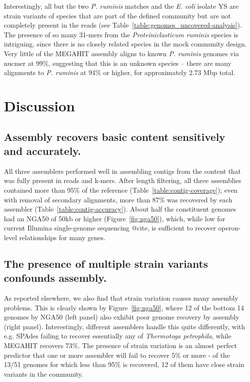 \documentclass[11pt]{article}
\begin{document}
Interestingly, all but the two {\em P. ruminis} matches and the {\em
  E. coli} isolate YS are strain variants of species that are part of
the defined community but are not completely present in the reads (see
Table~\ref{table:genomes_uncovered-analysis}).  The presence of so
many 31-mers from the {\em Proteiniclasticum ruminis} species is
intriguing, since there is no closely related species in the mock
community design.  Very little of the MEGAHIT assembly aligns to known
{\em P. ruminis} genomes via nucmer at 99\%, suggesting that this is an
unknown species -- there are many alignments to {\em P. ruminis} at
94\% or higher, for approximately 2.73 Mbp total.

\section*{Discussion}

\subsection*{Assembly recovers basic content sensitively and accurately.}

All three assemblers performed well in assembling contigs from the
content that was fully present in reads and k-mers.  After length filtering,
all three assemblies contained more than 95\% of the reference
(Table~\ref{table:contig-coverage}); even with removal of secondary
alignments, more than 87\% was recovered by each assembler
(Table~\ref{table:contig-accuracy}). About half the constituent genomes had
an NGA50 of 50kb or higher (Figure~\ref{fig:nga50}),
which, while low for current Illumina single-genome sequencing @cite,
is sufficient to recover operon-level relationships for many genes.



\subsection*{The presence of multiple strain variants confounds assembly.}

As reported elsewhere, we also find that strain variation causes many
assembly problems.  This is clearly shown by Figure~\ref{fig:nga50},
where 12 of the bottom 14 genomes by NGA50 (left panel) also exhibit
poor genome recovery by assembly (right panel).  Interestingly,
different assemblers handle this quite differently, with e.g. SPAdes
failing to recover essentially any of {\em Thermotoga petrophila},
while MEGAHIT recovers 73\%.  The presence of strain variation is an
almost perfect predictor that one or more assembler will fail to recover
5\% or more - of the 13/51 genomes for which less than 95\% is recovered,
12 of them have close strain variants in the community.
\end{document}
